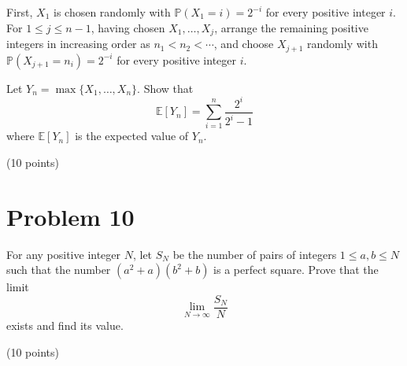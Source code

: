\documentclass{article}
\begin{document}
First, $X_1$ is chosen randomly with $\mathbb{P}(X_1 = i) = 2^{-i}$ for every positive integer $i$. For $1 \leq j \leq n-1$, having chosen $X_1, \ldots, X_j$, arrange the remaining positive integers in increasing order as $n_1 < n_2 < \cdots$, and choose $X_{j+1}$ randomly with $\mathbb{P}(X_{j+1} = n_i) = 2^{-i}$ for every positive integer $i$.

Let $Y_n = \max\{X_1, \ldots, X_n\}$. Show that
\[
\mathbb{E}[Y_n] = \sum_{i=1}^n \frac{2^i}{2^i - 1}
\]
where $\mathbb{E}[Y_n]$ is the expected value of $Y_n$.

(10 points)

\section*{Problem 10}
For any positive integer $N$, let $S_N$ be the number of pairs of integers $1 \leq a, b \leq N$ such that the number $(a^2 + a)(b^2 + b)$ is a perfect square. Prove that the limit
\[
\lim_{N \to \infty} \frac{S_N}{N}
\]
exists and find its value.

(10 points)
\end{document}
